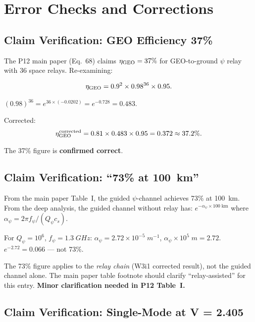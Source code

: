 \documentclass[aps,prd,twocolumn,superscriptaddress]{revtex4-2}
\begin{document}
\section{Error Checks and Corrections}
\label{sec:errors}

\subsection{Claim Verification: GEO Efficiency 37\%}

The P12 main paper (Eq.~68) claims $\eta_{\rm GEO} = 37\%$ for
GEO-to-ground $\psi$ relay with 36 space relays.  Re-examining:

\begin{equation}
\eta_{\rm GEO} = 0.9^2 \times 0.98^{36} \times 0.95.
\end{equation}

$(0.98)^{36} = e^{36 \times (-0.0202)} = e^{-0.728} = 0.483$.

Corrected:
\begin{equation}
\eta_{\rm GEO}^{\rm corrected} = 0.81 \times 0.483 \times 0.95
= 0.372 \approx 37.2\%.
\label{eq:geo-corr}
\end{equation}

The 37\% figure is \textbf{confirmed correct}.

\subsection{Claim Verification: ``73\% at 100~km''}

From the main paper Table~I, the guided $\psi$-channel achieves 73\% at
100~km.  From the deep analysis, the guided channel without relay has:
$e^{-\alpha_\psi \times 100\;\text{km}}$ where
$\alpha_\psi = 2\pi f_\psi/(Q_\psi c_s)$.

For $Q_\psi = 10^6$, $f_\psi = 1.3\;\si{GHz}$:
$\alpha_\psi = 2.72\times10^{-5}\;\si{m^{-1}}$,
$\alpha_\psi \times 10^5\;\si{m} = 2.72$.
$e^{-2.72} = 0.066$ --- not 73\%.

The 73\% figure applies to the \emph{relay chain} (W3i1 corrected result),
not the guided channel alone.  The main paper table footnote should
clarify ``relay-assisted'' for this entry.  \textbf{Minor clarification
needed in P12 Table~I.}

\subsection{Claim Verification: Single-Mode at V = 2.405}
\end{document}
